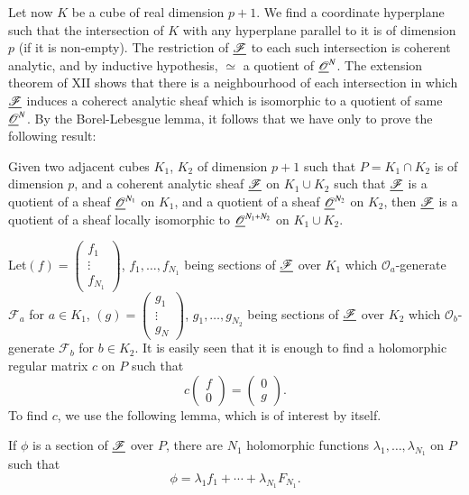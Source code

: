 Let now $K$ be a cube of real dimension $p+1$. We find a coordinate
hyperplane such that the intersection of $K$ with any hyperplane
parallel to it is of dimension $p$ (if it is non-empty). The
restriction of $\underline{\mathscr{F}}$ to each such intersection is coherent
analytic, and by inductive hypothesis, $\simeq$ a quotient of
$\underline{\mathscr{O}}^N$. The extension theorem of XII shows that there is
a neighbourhood of each intersection in which $\underline{\mathscr{F}}$
induces a coherect analytic sheaf which is isomorphic to a quotient of
same $\underline{\mathscr{O}}^N$. By the Borel-Lebesgue lemma, it follows that
we have only to prove the following result:

Given two adjacent cubes $K_1$, $K_2$ of dimension $p+1$ such that $P=
K_1 \cap K_2$ is of dimension $p$, and a coherent analytic sheaf
$\underline{\mathscr{F}}$ on $K_1 \cup K_2$ such that $\underline{\mathscr{F}}$ is a
quotient of a sheaf $\underline{\mathscr{O}}^{N_1}$ on $K_1$, and a quotient
of a sheaf $\underline{\mathscr{O}}^{N_2}$ on $K_2$, then $\underline{\mathscr{F}}$ is
a quotient of a sheaf locally isomorphic to
$\underline{\mathscr{O}}^{N_1+N_2}$ on $K_1 \cup K_2$. 

Let\pageoriginale $(f) = \begin{pmatrix} 
f_1\\\vdots \\f_{N_1} \end{pmatrix}$, $f_1, \ldots, f_{N_1}$
being sections of $\underline{\mathscr{F}}$ over $K_1$ which
$\mathscr{O}_a$-generate $\mathscr{F}_a$ for $a \in K_1$, $(g) =
 \begin{pmatrix}
g_1\\ \vdots \\ g_N\end{pmatrix}$, $g_1 , \ldots, g_{N_2}$ being
sections of $\underline{\mathscr{F}}$ over $K_2$ which
$\mathscr{O}_b$-generate $\mathscr{F}_b$ for $b \in K_2$. It is easily
seen that it is enough to find a holomorphic regular matrix $c$ on $P$
such that 
$$
c\begin{pmatrix}
f\\0 
\end{pmatrix} =
\begin{pmatrix}
0 \\ g
\end{pmatrix}.
$$ 
To find $c$, we use the following lemma, which is of interest by
itself. 

\begin{lemma*}
If $\phi$ is a section of $\underline{\mathscr{F}}$ over $P$, there are $N_1$
holomorphic functions $\lambda_1, \ldots, \lambda_{N_1}$ on $P$ such
that 
$$
\phi = \lambda_1 f_1 + \cdots + \lambda_{N_1} F_{N_1}. 
$$
\end{lemma*}

